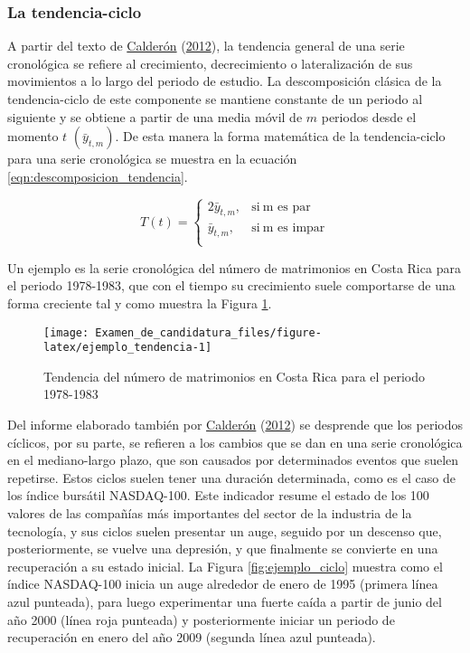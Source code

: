 \documentclass[
]{article}
\begin{document}
\subsubsection{La tendencia-ciclo}

A partir del texto de
\protect\hyperlink{ref-calderon2012estadistica}{Calderón}
(\protect\hyperlink{ref-calderon2012estadistica}{2012}), la tendencia
general de una serie cronológica se refiere al crecimiento,
decrecimiento o lateralización de sus movimientos a lo largo del periodo
de estudio. La descomposición clásica de la tendencia-ciclo de este
componente se mantiene constante de un periodo al siguiente y se obtiene
a partir de una media móvil de \(m\) periodos desde el momento \(t\)
\(\left(\bar y_{t,m}\right)\). De esta manera la forma matemática de la
tendencia-ciclo para una serie cronológica se muestra en la ecuación
\ref{eqn:descomposicion_tendencia}.

\begin{equation}
\label{eqn:descomposicion_tendencia}
T(t)=
\begin{cases}
2\bar y_{t,m}, & \text{si}\ \text{m es par} \\
\bar y_{t, m}, & \text{si}\ \text{m es impar} \\
\end{cases}
\end{equation}

Un ejemplo es la serie cronológica del número de matrimonios en Costa
Rica para el periodo 1978-1983, que con el tiempo su crecimiento suele
comportarse de una forma creciente tal y como muestra la Figura
\ref{fig:ejemplo_tendencia}.

\begin{figure}[H]
\texttt{[image: Examen\_de\_candidatura\_files/figure-latex/ejemplo\_tendencia-1]} \caption{Tendencia del número de matrimonios en Costa Rica para el periodo 1978-1983}\label{fig:ejemplo_tendencia}
\end{figure}

Del informe elaborado también por
\protect\hyperlink{ref-calderon2012estadistica}{Calderón}
(\protect\hyperlink{ref-calderon2012estadistica}{2012}) se desprende que
los periodos cíclicos, por su parte, se refieren a los cambios que se
dan en una serie cronológica en el mediano-largo plazo, que son causados
por determinados eventos que suelen repetirse. Estos ciclos suelen tener
una duración determinada, como es el caso de los índice bursátil
NASDAQ-100. Este indicador resume el estado de los 100 valores de las
compañías más importantes del sector de la industria de la tecnología, y
sus ciclos suelen presentar un auge, seguido por un descenso que,
posteriormente, se vuelve una depresión, y que finalmente se convierte
en una recuperación a su estado inicial. La Figura
\ref{fig:ejemplo_ciclo} muestra como el índice NASDAQ-100 inicia un auge
alrededor de enero de 1995 (primera línea azul punteada), para luego
experimentar una fuerte caída a partir de junio del año 2000 (línea roja
punteada) y posteriormente iniciar un periodo de recuperación en enero
del año 2009 (segunda línea azul punteada).
\end{document}
